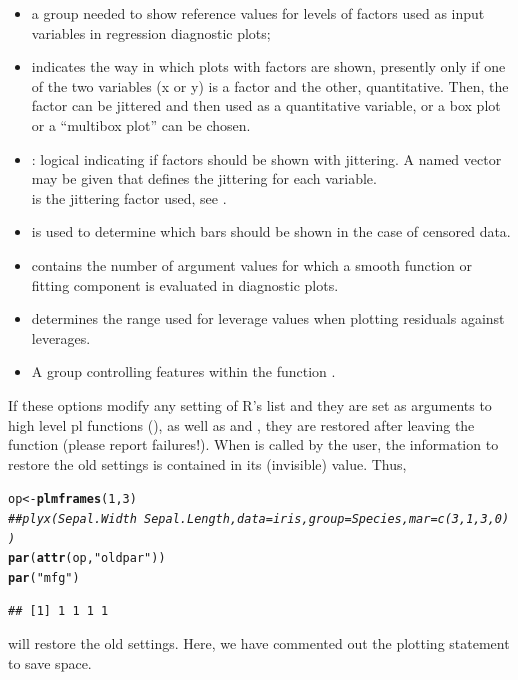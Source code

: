 \documentclass[11pt]{article}\usepackage[]{graphicx}\usepackage[]{color}
\makeatletter
\newcommand{\hlnum}[1]{\textcolor[rgb]{0.686,0.059,0.569}{#1}}%
\newcommand{\hlstr}[1]{\textcolor[rgb]{0.192,0.494,0.8}{#1}}%
\newcommand{\hlcom}[1]{\textcolor[rgb]{0.678,0.584,0.686}{\textit{#1}}}%
\newcommand{\hlstd}[1]{\textcolor[rgb]{0.345,0.345,0.345}{#1}}%
\newcommand{\hlkwb}[1]{\textcolor[rgb]{0.69,0.353,0.396}{#1}}%
\newcommand{\hlkwd}[1]{\textcolor[rgb]{0.737,0.353,0.396}{\textbf{#1}}}%
\newenvironment{kframe}{%
 \def\at@end@of@kframe{}%
 \ifinner\ifhmode%
  \def\at@end@of@kframe{\end{minipage}}%
  \begin{minipage}{\columnwidth}%
 \fi\fi%
 \def\FrameCommand##1{\hskip\@totalleftmargin \hskip-\fboxsep
 \colorbox{shadecolor}{##1}\hskip-\fboxsep
     \hskip-\linewidth \hskip-\@totalleftmargin \hskip\columnwidth}%
 \MakeFramed {\advance\hsize-\width
   \@totalleftmargin\z@ \linewidth\hsize
   \@setminipage}}%
 {\par\unskip\endMakeFramed%
 \at@end@of@kframe}
\newenvironment{knitrout}{}{} %
\makeatother
\begin{document}
\begin{itemize}
\item
  a group  needed to show reference values for levels of factors
  used as input variables in regression diagnostic plots;
\item
   indicates the way in which plots with factors are shown,
  presently only if one of the two variables (x or y) is a factor and the
  other, quantitative. Then, the factor can be jittered and then used
  as a quantitative variable, or a box plot or a ``multibox plot'' can be 
  chosen.
\item
  : logical indicating if factors should be shown with jittering.
  A named vector may be given that defines the jittering for each
  variable.\\ 
   is the jittering factor used, see .
\item
   is used to determine which bars should be shown
  in the case of censored data.
\item
   contains the number of argument values for which 
  a smooth function or fitting component is evaluated in diagnostic plots.
\item
   determines the range used for leverage values
  when plotting residuals against leverages.
\item
  A group  controlling features within the function .
\end{itemize}

If these options modify any setting of R's  list and they are 
set as arguments to high level pl functions 
(), as well as 
 and ,
they are restored after leaving the function (please report failures!).
When  is called by the user, the information to restore 
the old settings is contained in its (invisible) value.
Thus, 
\begin{knitrout}
\color{fgcolor}\begin{kframe}
\begin{alltt}
\hlstd{op} \hlkwb{<-} \hlkwd{plmframes}\hlstd{(}\hlnum{1}\hlstd{,}\hlnum{3}\hlstd{)}
\hlcom{## plyx(Sepal.Width~Sepal.Length, data=iris, group=Species, mar=c(3,1,3,0))}
\hlkwd{par}\hlstd{(}\hlkwd{attr}\hlstd{(op,} \hlstr{"oldpar"}\hlstd{))}
\hlkwd{par}\hlstd{(}\hlstr{"mfg"}\hlstd{)}
\end{alltt}
\begin{verbatim}
## [1] 1 1 1 1
\end{verbatim}
\end{kframe}
\end{knitrout}
will restore the old settings. Here, we have commented out the plotting
statement to save space.
\end{document}
